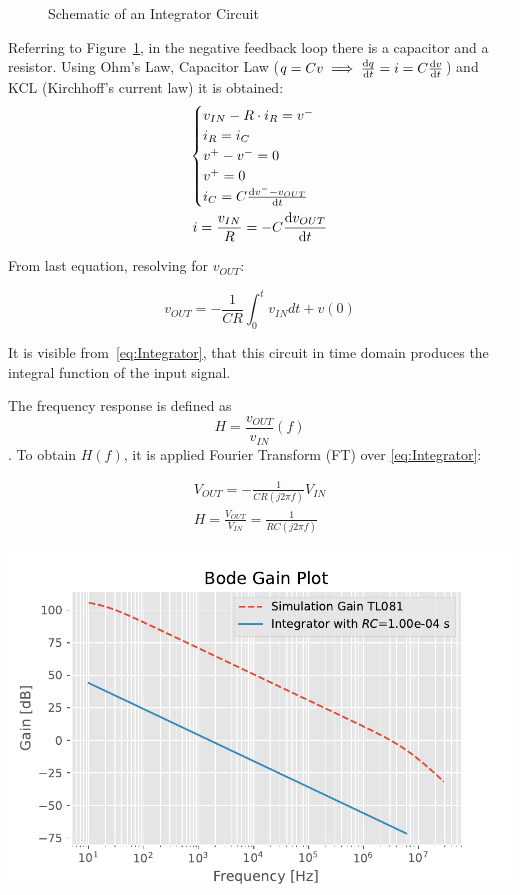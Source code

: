 \documentclass[a4paper, twocolumn]{article}
\begin{document}
\begin{figure}
    \centering
    \def\svgwidht{\columnwidth}
    
    \caption{Schematic of an Integrator Circuit}
    \label{fig:IntegrScheme}
\end{figure}

Referring to Figure~\ref{fig:IntegrScheme}, in the negative feedback loop there is a capacitor and a resistor.
Using Ohm's Law, Capacitor Law ($ q = Cv \implies \dv {q}{t}=i=C\dv{v}{t} $) and KCL (Kirchhoff's current law) it is obtained:
\begin{gather*}
    \begin{cases}
        v_{IN} - R\cdot i_R = v^-\\
        i_R=i_C\\
        v^+-v^-=0\\
        v^+=0\\
        i_C=C\dv{v^--v_{OUT}}{t}
    \end{cases}\\
    i = \frac{v_{IN}}{R}=-C\dv{v_{OUT}}{t}\\
\end{gather*}

From last equation, resolving for $v_{OUT}$:

\begin{equation}
    \label{eq:Integrator}
    v_{OUT}=-\frac{1}{CR}\int_0^t{v_{IN}}dt + v(0)
\end{equation}

It is visible from~\eqref{eq:Integrator}, that this circuit in time domain produces the integral function of the input signal.

The frequency response is defined as \[H=\frac{v_{OUT}}{v_{IN}}(f)\].
To obtain $H(f)$, it is applied Fourier Transform (FT) over \eqref{eq:Integrator}:

\begin{gather}
    V_{OUT}=-\frac{1}{CR(j2\pi f)}V_{IN}\\
    H = \frac{V_{OUT}}{V_{IN}} = \frac{1}{RC(j2\pi f)}   
\end{gather}

\begin{center}
    \includegraphics[width=\columnwidth]{def_graph/IntegratorBodeTheo.pdf}
    \label{fig:IntBodeGraphTheo}
\end{center}
\end{document}
